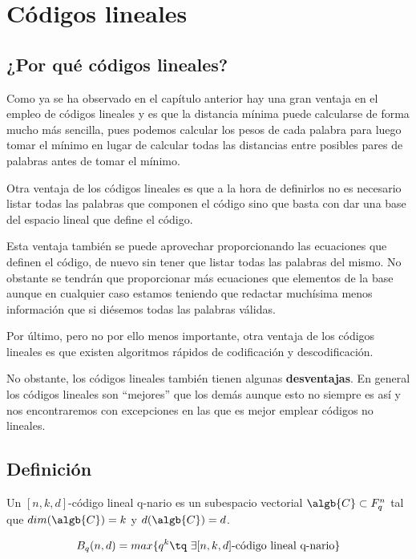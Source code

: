 \chapter{Códigos lineales}
\section{¿Por qué códigos lineales?}
Como ya se ha observado en el capítulo anterior hay una gran ventaja en el empleo de códigos lineales y es que la distancia mínima puede calcularse de forma mucho más sencilla, pues podemos calcular los pesos de cada palabra para luego tomar el mínimo en lugar de calcular todas las distancias entre posibles pares de palabras antes de tomar el mínimo.

Otra ventaja de los códigos lineales es que a la hora de definirlos no es necesario listar todas las palabras que componen el código sino que basta con dar una base del espacio lineal que define el código.

Esta ventaja también se puede aprovechar proporcionando las ecuaciones que definen el código, de nuevo sin tener que listar todas las palabras del mismo. No obstante se tendrán que proporcionar más ecuaciones que elementos de la base aunque en cualquier caso estamos teniendo que redactar muchísima menos información que si diésemos todas las palabras válidas.

Por último, pero no por ello menos importante, otra ventaja de los códigos lineales es que existen algoritmos rápidos de codificación y descodificación.

No obstante, los códigos lineales también tienen algunas \textbf{desventajas}. En general los códigos lineales son ``mejores'' que los demás aunque esto no siempre es así y nos encontraremos con excepciones en las que es mejor emplear códigos no lineales.

\section{Definición}

\begin{defn}
Un $[n,k,d]$-código lineal q-nario es un subespacio vectorial $\algb{C} \subset F_q^n$ tal que $dim(\algb{C})=k$ y $d(\algb{C})=d$.
\end{defn}

\begin{defn}[B$_q(n,d)$]
\[B_q(n,d)=max \{q^k \tq \ \exists [n,k,d]\text{-código lineal q-nario}\}\]
\end{defn}

